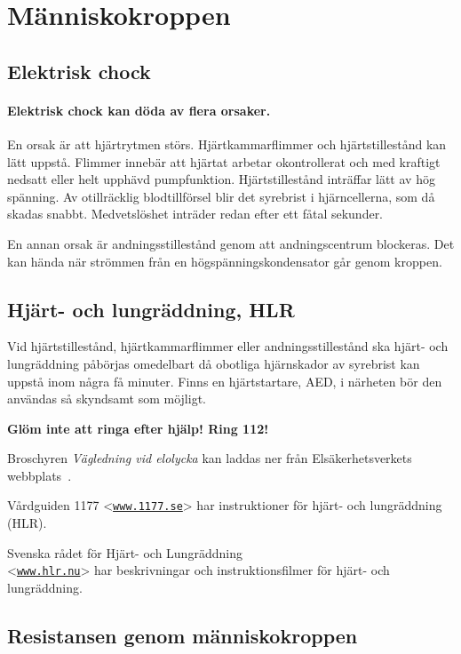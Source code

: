 \section{Människokroppen}

\subsection{Elektrisk chock}
\paragraph{Elektrisk chock kan döda av flera orsaker.}
En orsak är att hjärtrytmen störs.
Hjärtkammarflimmer och hjärtstillestånd kan lätt uppstå.
Flimmer innebär att hjärtat arbetar okontrollerat och med kraftigt nedsatt
eller helt upphävd pumpfunktion.
Hjärtstillestånd inträffar lätt av hög spänning.
Av otillräcklig blodtillförsel blir det syrebrist i hjärncellerna, som då
skadas snabbt.
Medvetslöshet inträder redan efter ett fåtal sekunder.

En annan orsak är andningsstillestånd genom att andningscentrum blockeras.
Det kan hända när strömmen från en högspänningskondensator går genom kroppen.

\subsection{Hjärt- och lungräddning, HLR}

Vid hjärtstillestånd, hjärtkammarflimmer eller andningsstillestånd ska
hjärt- och lungräddning påbörjas omedelbart då obotliga hjärnskador av
syrebrist kan uppstå inom några få minuter.
Finns en hjärtstartare, AED, i närheten bör den användas så skyndsamt som
möjligt.

\textbf{Glöm inte att ringa efter hjälp! Ring 112!}

Broschyren \emph{Vägledning vid elolycka} kan laddas ner från Elsäkerhetsverkets
webbplats~\cite{broschyr-elolycka}.

Vårdguiden 1177 <\href{https://www.1177.se}{\texttt{www.1177.se}}> har
instruktioner för hjärt- och lungräddning (HLR).

Svenska rådet för Hjärt- och Lungräddning \\
<\href{https://www.hlr.nu}{\texttt{www.hlr.nu}}> har beskrivningar och
instruktionsfilmer för hjärt- och lungräddning.

\subsection{Resistansen genom människo\-kroppen}

